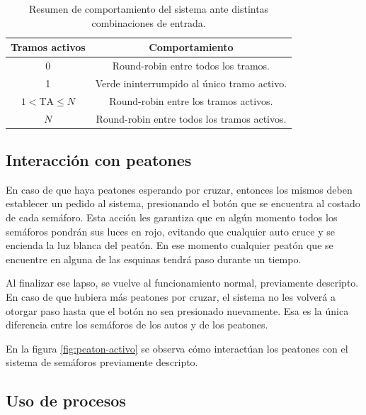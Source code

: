 		\begin{table}[htbp]
			\centering
			\caption{Resumen de comportamiento del sistema ante distintas combinaciones de entrada.}
			\vspace{0.25cm}
			\label{tab:comportamiento}
			\begin{tabular}{cc}
				\toprule
				\bf{Tramos activos} & \bf{Comportamiento} \\
				\midrule
				0 & Round-robin entre todos los tramos. \\
				1 & Verde ininterrumpido al único tramo activo. \\
				$1 < \mbox{TA} \le N$ & Round-robin entre los tramos activos. \\
				$N$ & Round-robin entre todos los tramos activos. \\
				\bottomrule
			\end{tabular}
		\end{table}



	\subsection{Interacción con peatones}

		En caso de que haya peatones esperando por cruzar, entonces los mismos deben establecer un pedido al sistema, presionando el botón que se encuentra al costado de cada semáforo.
		Esta acción les garantiza que en algún momento todos los semáforos pondrán sus luces en rojo, evitando que cualquier auto cruce y se encienda la luz blanca del peatón.
		En ese momento cualquier peatón que se encuentre en alguna de las esquinas tendrá paso durante un tiempo.

		Al finalizar ese lapso, se vuelve al funcionamiento normal, previamente descripto.
		En caso de que hubiera más peatones por cruzar, el sistema no les volverá a otorgar paso hasta que el botón no sea presionado nuevamente.
		Esa es la única diferencia entre los semáforos de los autos y de los peatones.

		En la figura \ref{fig:peaton-activo} se observa cómo interactúan los peatones con el sistema de semáforos previamente descripto.




	\subsection{Uso de procesos}\label{sec:proc}

